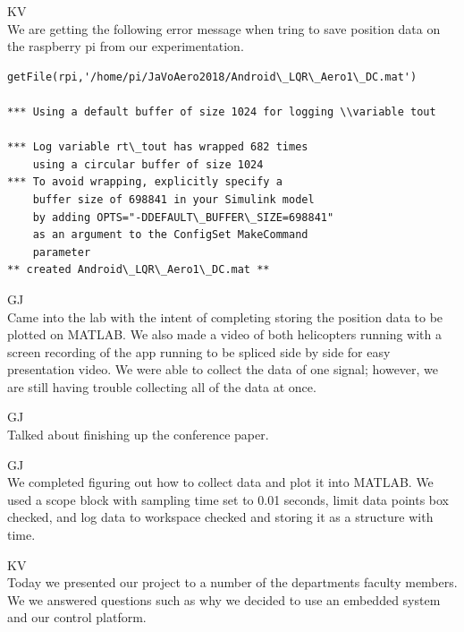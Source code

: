 \documentclass[fontsize=11pt, %
                             paper=letter, %
                             openany, %
                             captions=tableheading,
                             index=totoc,
                             hyperref]{labbook}
\begin{document}
\begin{addmargin}[0cm]{0cm}
KV\\
We are getting the following error message when tring to save position data on the raspberry pi from our experimentation. 
%
\begin{verbatim}
getFile(rpi,'/home/pi/JaVoAero2018/Android\_LQR\_Aero1\_DC.mat')

*** Using a default buffer of size 1024 for logging \\variable tout

*** Log variable rt\_tout has wrapped 682 times
    using a circular buffer of size 1024
*** To avoid wrapping, explicitly specify a
    buffer size of 698841 in your Simulink model
    by adding OPTS="-DDEFAULT\_BUFFER\_SIZE=698841"
    as an argument to the ConfigSet MakeCommand
    parameter
** created Android\_LQR\_Aero1\_DC.mat **    
\end{verbatim}


GJ\\
Came into the lab with the intent of completing storing the position data to be plotted on MATLAB.  We also made a video of both helicopters running with a screen recording of the app running to be spliced side by side for easy presentation video. We were able to collect the data of one signal; however, we are still having trouble collecting all of the data at once.

GJ\\
Talked about finishing up the conference paper.

GJ\\
We completed figuring out how to collect data and plot it into MATLAB.  We used a scope block with sampling time set to 0.01 seconds, limit data points box checked, and log data to workspace checked and storing it as a structure with time.

KV\\
Today we presented our project to a number of the departments faculty members.  We we answered questions such as why we decided to use an embedded system and our control platform.


\end{addmargin}
\end{document}
